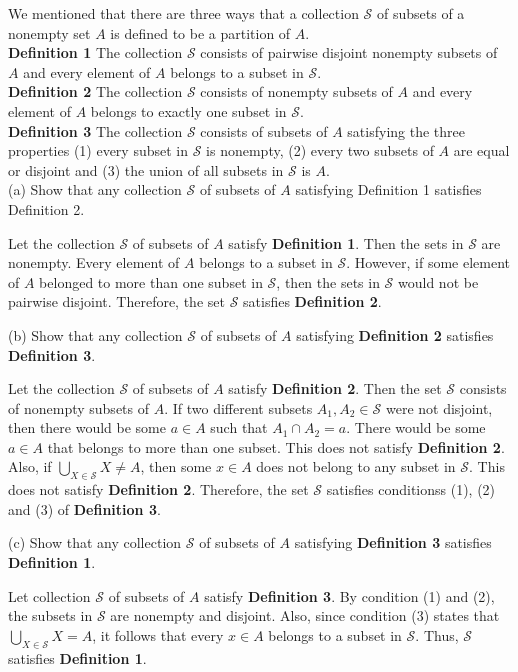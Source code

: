 \documentclass[12pt]{article}
\newenvironment{problem}[2][Problem]{\begin{trivlist}
		\item[\hskip \labelsep {\bfseries #1}\hskip \labelsep {\bfseries #2.}]}{\end{trivlist}}
\newenvironment{solution}[2][Solution]{\begin{trivlist}
		\item[\hskip \labelsep {\bfseries #1}\hskip \labelsep {\bfseries #2.}]}{\end{trivlist}}
\begin{document}
\begin{problem}{56}
	We mentioned that there are three ways that a collection $\mathcal{S}$ of subsets of a nonempty set $A$ is defined to be a partition of $A$.\\
	\textbf{Definition 1} The collection $\mathcal{S}$ consists of pairwise disjoint nonempty subsets of $A$ and every element of $A$ belongs to a subset in $\mathcal{S}$.\\
	\textbf{Definition 2} The collection $\mathcal{S}$ consists of nonempty subsets of $A$ and every element of $A$ belongs to exactly one subset in $\mathcal{S}$.\\
	\textbf{Definition 3} The collection $\mathcal{S}$ consists of subsets of $A$ satisfying the three properties (1) every subset in $\mathcal{S}$ is nonempty, (2) every two subsets of $A$ are equal or disjoint and (3) the union of all subsets in $\mathcal{S}$ is $A$.\\
	 
	(a) Show that any collection $\mathcal{S}$ of subsets of $A$ satisfying Definition 1 satisfies Definition 2.
	\begin{solution}{a}
		Let the collection $\mathcal{S}$ of subsets of $A$ satisfy \textbf{Definition 1}. Then the sets in $\mathcal{S}$ are nonempty. Every element of $A$ belongs to a subset in $\mathcal{S}$. However, if some element of $A$ belonged to more than one subset in $\mathcal{S}$, then the sets in $\mathcal{S}$ would not be pairwise disjoint. Therefore, the set $\mathcal{S}$ satisfies \textbf{Definition 2}.
	\end{solution}

	(b) Show that any collection $\mathcal{S}$ of subsets of $A$ satisfying \textbf{Definition 2} satisfies \textbf{Definition 3}.
	\begin{solution}{b} 
			Let the collection $\mathcal{S}$ of subsets of $A$ satisfy \textbf{Definition 2}. Then the set $\mathcal{S}$ consists of nonempty subsets of $A$. If two different subsets $A_{1},A_{2} \in \mathcal{S}$ were not disjoint, then there would be some $a\in A$ such that $A_{1}\cap A_{2} = a$. There would be some $a\in A$ that belongs to more than one subset. This does not satisfy \textbf{Definition 2}. Also, if $\bigcup_{X\in \mathcal{S}}X \neq A$, then some $x\in A$ does not belong to any subset in $\mathcal{S}$. This does not satisfy \textbf{Definition 2}. Therefore, the set $\mathcal{S}$ satisfies conditionss (1), (2) and (3) of \textbf{Definition 3}.
	\end{solution} 

	(c) Show that any collection $\mathcal{S}$ of subsets of $A$ satisfying \textbf{Definition 3} satisfies \textbf{Definition 1}.
	\begin{solution}{c}
		Let collection $\mathcal{S}$ of subsets of $A$ satisfy \textbf{Definition 3}. By condition (1) and (2), the subsets in $\mathcal{S}$ are nonempty and disjoint. Also, since condition (3) states that $\bigcup_{X\in \mathcal{S}}X = A$, it follows that every $x \in A$ belongs to a subset in $\mathcal{S}$. Thus, $\mathcal{S}$ satisfies \textbf{Definition 1}.
	\end{solution}
\end{problem}
\end{document}
